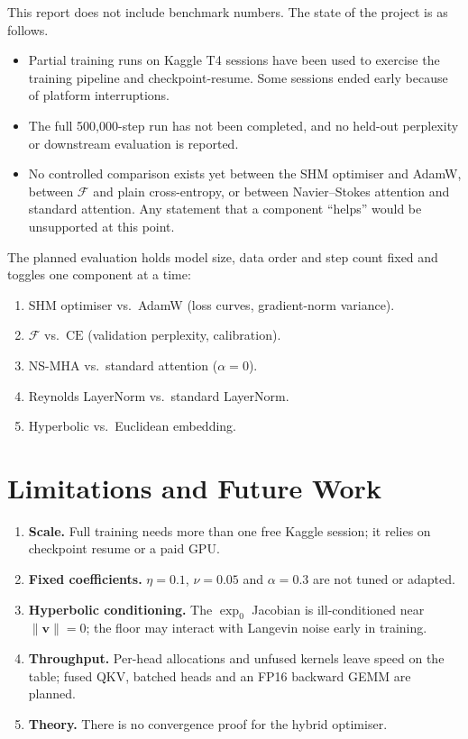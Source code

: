 \documentclass[11pt,a4paper]{article}
\newcommand{\calF}{\mathcal{F}}
\newcommand{\CE}{\mathrm{CE}}
\begin{document}
This report does not include benchmark numbers. The state of the
project is as follows.
\begin{itemize}
  \item Partial training runs on Kaggle T4 sessions have been used to
        exercise the training pipeline and checkpoint-resume. Some
        sessions ended early because of platform interruptions.
  \item The full 500{,}000-step run has not been completed, and no
        held-out perplexity or downstream evaluation is reported.
  \item No controlled comparison exists yet between the SHM optimiser
        and AdamW, between $\calF$ and plain cross-entropy, or between
        Navier--Stokes attention and standard attention. Any statement
        that a component ``helps'' would be unsupported at this point.
\end{itemize}
The planned evaluation holds model size, data order and step count
fixed and toggles one component at a time:
\begin{enumerate}
  \item SHM optimiser vs.\ AdamW (loss curves, gradient-norm variance).
  \item $\calF$ vs.\ $\CE$ (validation perplexity, calibration).
  \item NS-MHA vs.\ standard attention ($\alpha=0$).
  \item Reynolds LayerNorm vs.\ standard LayerNorm.
  \item Hyperbolic vs.\ Euclidean embedding.
\end{enumerate}

\section{Limitations and Future Work}
\label{sec:discussion}

\begin{enumerate}
  \item \textbf{Scale.} Full training needs more than one free Kaggle
        session; it relies on checkpoint resume or a paid GPU.
  \item \textbf{Fixed coefficients.} $\eta=0.1$, $\nu=0.05$ and
        $\alpha=0.3$ are not tuned or adapted.
  \item \textbf{Hyperbolic conditioning.} The $\exp_0$ Jacobian is
        ill-conditioned near $\|\mathbf{v}\|=0$; the floor may interact
        with Langevin noise early in training.
  \item \textbf{Throughput.} Per-head allocations and unfused kernels
        leave speed on the table; fused QKV, batched heads and an FP16
        backward GEMM are planned.
  \item \textbf{Theory.} There is no convergence proof for the hybrid
        optimiser.
\end{enumerate}
\end{document}
